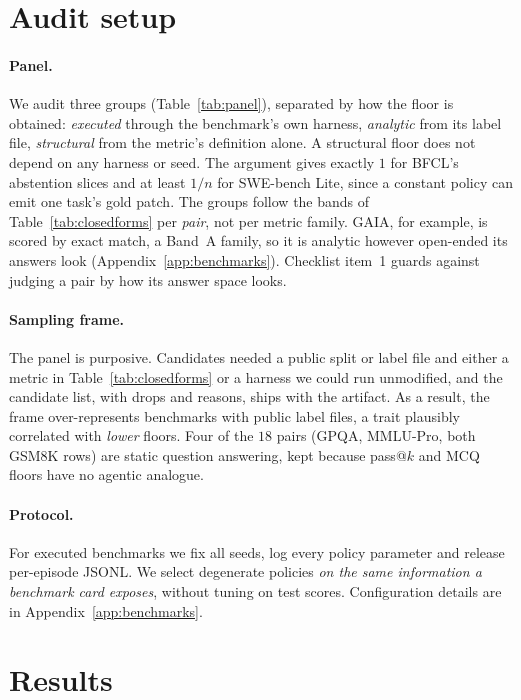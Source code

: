 \documentclass{article}
\theoremstyle{plain}
\theoremstyle{definition}
\begin{document}
\section{Audit setup}
\label{sec:setup}

\paragraph{Panel.}
We audit three groups (Table~\ref{tab:panel}), separated by how the floor is obtained: \emph{executed} through the benchmark's own harness, \emph{analytic} from its label file, \emph{structural} from the metric's definition alone. A structural floor does not depend on any harness or seed. The argument gives exactly $1$ for BFCL's abstention slices and at least $1/n$ for SWE-bench Lite, since a constant policy can emit one task's gold patch. The groups follow the bands of Table~\ref{tab:closedforms} per \emph{pair}, not per metric family. GAIA, for example, is scored by exact match, a Band~A family, so it is analytic however open-ended its answers look (Appendix~\ref{app:benchmarks}). Checklist item~1 guards against judging a pair by how its answer space looks.

\paragraph{Sampling frame.}
The panel is purposive. Candidates needed a public split or label file and either a metric in Table~\ref{tab:closedforms} or a harness we could run unmodified, and the candidate list, with drops and reasons, ships with the artifact. As a result, the frame over-represents benchmarks with public label files, a trait plausibly correlated with \emph{lower} floors. Four of the $18$ pairs (GPQA, MMLU-Pro, both GSM8K rows) are static question answering, kept because pass@$k$ and MCQ floors have no agentic analogue.

\paragraph{Protocol.}
For executed benchmarks we fix all seeds, log every policy parameter and release per-episode JSONL. We select degenerate policies \emph{on the same information a benchmark card exposes}, without tuning on test scores. Configuration details are in Appendix~\ref{app:benchmarks}.

\section{Results}
\label{sec:results}
\end{document}

